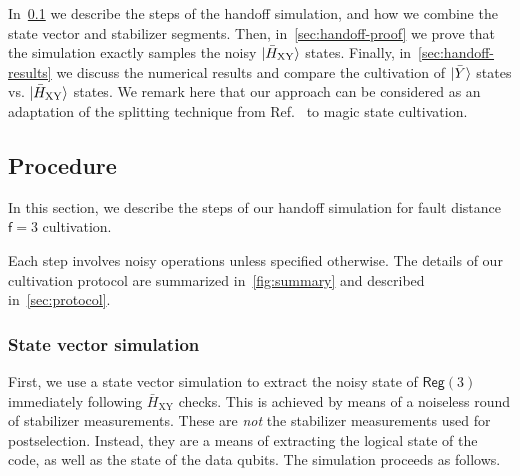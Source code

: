 \documentclass[%
    aps, 
    physrev,
    reprint,
]{revtex4-2}
\newcommand{\fd}[1]{\mathsf{f}=#1}
\newcommand{\rot}[1]{\mathsf{Rot}(#1)}
\newcommand{\reg}[1]{\mathsf{Reg}(#1)}
\newcommand{\XY}{_\mathrm{XY}}
\newcommand{\fin}{_\mathrm{fin}}
\begin{document}
In~\cref{sec:handoff-steps} we describe the steps of the handoff simulation, and how we combine the state vector and stabilizer segments.
Then, in~\cref{sec:handoff-proof} we prove that the simulation exactly samples the noisy $\ket{\bar{H}\XY}$ states.
Finally, in~\cref{sec:handoff-results} we discuss the numerical results and compare the cultivation of $\ket{\bar{Y}}$ states vs. $\ket{\bar{H}\XY}$ states.
We remark here that our approach can be considered as an adaptation of the splitting technique from Ref.~\cite{lima_clifford_2025} to magic state cultivation.

\subsection{Procedure}\label{sec:handoff-steps}

\newcommand{\A}{_a}
\newcommand{\B}{_b}

In this section, we describe the steps of our handoff simulation  for fault distance $\fd3$ cultivation.

Each step involves noisy operations unless specified otherwise.
The details of our cultivation protocol are summarized in~\cref{fig:summary} and described in~\cref{sec:protocol}.

\subsubsection{State vector simulation}

First, we use a state vector simulation to extract the noisy state of $\reg3$ immediately following $\bar{H}\XY$ checks.
This is achieved by means of a noiseless round of stabilizer measurements.
These are \textit{not} the stabilizer measurements used for postselection.
Instead, they are a means of extracting the logical state of the code, as well as the state of the data qubits.
The simulation proceeds as follows.
\end{document}
